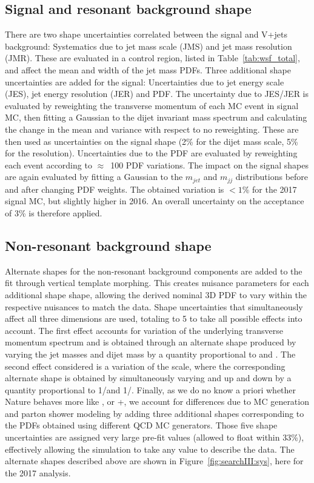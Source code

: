 \subsection{Signal and resonant background shape}
There are two shape uncertainties correlated between the signal and V+jets background: Systematics due to jet mass scale (JMS) and jet mass resolution (JMR). These are evaluated in a \ttbar control region, listed in Table~\ref{tab:wsf_total}, and affect the mean and width of the jet mass PDFs. 
Three additional shape uncertainties are added for the signal: Uncertainties due to jet energy scale (JES), jet energy resolution (JER) and PDF. The uncertainty due to JES/JER is evaluated by reweighting the transverse momentum of each MC event in signal MC, then fitting a Gaussian to the dijet invariant mass spectrum and calculating the change in the mean and variance with respect to no reweighting. These are then used as uncertainties on the signal \MVV shape (2\% for the dijet mass scale, 5\% for the resolution).\newline
Uncertainties due to the PDF are evaluated by reweighting each event according to $\approx$~100 PDF variations. The impact on the signal shapes are again evaluated by fitting a Gaussian to the $m_{jet}$ and $m_{jj}$ distributions before and after changing PDF weights. The obtained variation is $<1\%$ for the 2017 signal MC, but slightly higher in 2016. An overall uncertainty on the acceptance of 3\% is therefore applied. 


\subsection{Non-resonant background shape}
Alternate shapes for the non-resonant background components are added to the fit through vertical template morphing. This creates nuisance parameters for each additional shape shape, allowing the derived nominal 3D PDF to vary within the respective nuisances to match the data. Shape uncertainties that simultaneously affect all three dimensions are used, totaling to 5 to take all possible effects into account. The first effect accounts for variation of the underlying transverse momentum spectrum and is obtained through an alternate shape produced by varying the jet masses \MJ and dijet mass \MVV by a quantity proportional to \MVV and \MJ. The second effect considered is a variation of the scale, where the corresponding alternate shape is obtained by simultaneously varying \MJ and \MVV up and down by a quantity proportional to 1/\MVV and 1/\MJ.
Finally, as we do no know a priori whether Nature behaves more like , \HERWIG{++} or \MADGRAPH{}+, we account for differences due to MC generation and parton shower modeling by adding three additional shapes corresponding to the PDFs obtained using different QCD MC generators.\newline
Those five shape uncertainties are assigned very large pre-fit values (allowed to float within 33\%), effectively allowing the simulation to take any value to describe the data. The alternate shapes described above are shown in Figure~\ref{fig:searchIII:sys}, here for the 2017 analysis.

